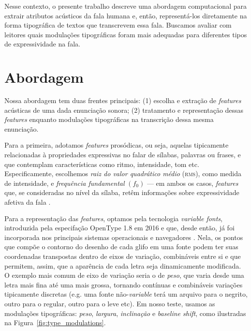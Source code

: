 \documentclass[11pt]{article}
\begin{document}
  Nesse contexto, o presente trabalho descreve uma abordagem computacional para extrair atributos acústicos da fala humana e, então, representá-los diretamente na forma tipográfica de textos que transcrevem essa fala. Buscamos avaliar com leitores quais modulações tipográficas foram mais adequadas para diferentes tipos de expressividade na fala.

  \section{Abordagem}
  \label{sec:abordagem}
  
  Nossa abordagem tem duas frentes principais: (1) escolha e extração de {\itshape features} acústicas de uma dada enunciação sonora; (2) tratamento e representação dessas {\itshape features} enquanto modulações tipográficas na transcrição dessa mesma enunciação.
  
  Para a primeira, adotamos {\itshape features} prosódicas, ou seja, aquelas tipicamente relacionadas à propriedades expressivas no falar de sílabas, palavras ou frases, e que contemplam características como ritmo, intensidade, tom etc. Especificamente, escolhemos {\itshape raiz do valor quadrático médio} \textsc{(rms)}, como medida de intensidade, e {\itshape frequência fundamental} $(f_0)$ --- em ambos os casos, {\itshape features} que, se consideradas no nível da sílaba, retêm informações sobre expressividade afetiva da fala \cite{rao2010characterization}.
  
  Para a representação das {\itshape features}, optamos pela tecnologia {\itshape variable fonts}, introduzida pela especifação OpenType 1.8 \cite{varfontssepcs} em 2016 e que, desde então, já foi incorporada nos principais sistemas operacionais e navegadores \cite{varfontossupport}. Nela, os pontos que compõe o contorno do desenho de cada glifo em uma fonte podem ter suas coordenadas transpostas dentro de eixos de variação, combináveis entre si e que permitem, assim, que a aparência de cada letra seja dinamicamente modificada. O exemplo mais comum de eixo de variação seria o de {\itshape peso}, que varia desde uma letra mais fina até uma mais grossa, tornando contínuas e combináveis variações tipicamente discretas (e.g. uma fonte não-{\itshape variable} terá um arquivo para o negrito, outro para o regular, outro para o leve etc). Em nosso teste, usamos as modulações tipográficas: {\itshape peso}, {\itshape largura}, {\itshape inclinação} e {\itshape baseline shift}, como ilustradas na Figura~\ref{fig:type_modulations}.
  
\end{document}
